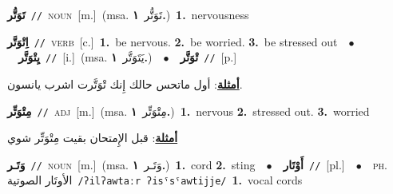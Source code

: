 \documentclass[10pt,a4paper,twoside]{article} %
\begin{document}
\begin{multicols}{2}
{{{{{\setlength\topsep{0pt}\textbf{\foreignlanguage{arabic}{تَوَتُّر}}\ {\color{gray}\texttt{//}\color{black}}\ \textsc{noun}\ [m.]\ \color{gray}(msa. \foreignlanguage{arabic}{تَوَتُّر}~\foreignlanguage{arabic}{\textbf{١.}})\color{black}\ \textbf{1.}~nervousness\ 

{\setlength\topsep{0pt}\textbf{\foreignlanguage{arabic}{اِتْوَتَّر}}\ {\color{gray}\texttt{//}\color{black}}\ \textsc{verb}\ [c.]\ \textbf{1.}~be nervous.  \textbf{2.}~be worried.  \textbf{3.}~be stressed out\ \ $\bullet$\ \ \setlength\topsep{0pt}\textbf{\foreignlanguage{arabic}{يِتْوَتَّر}}\ {\color{gray}\texttt{//}\color{black}}\ [i.]\ \color{gray}(msa. \foreignlanguage{arabic}{يَتَوَتَّر}~\foreignlanguage{arabic}{\textbf{١.}})\color{black}\ \ $\bullet$\ \ \setlength\topsep{0pt}\textbf{\foreignlanguage{arabic}{تْوَتَّر}}\ {\color{gray}\texttt{//}\color{black}}\ [p.]\  \begin{flushright}\color{gray}\foreignlanguage{arabic}{\textbf{\underline{\foreignlanguage{arabic}{أمثلة}}}: أول ماتحس حالك إِنك تْوَتَّرت اشرب يانسون.}\end{flushright}\color{black}} \vspace{2mm}

{\setlength\topsep{0pt}\textbf{\foreignlanguage{arabic}{مِتْوَتِّر}}\ {\color{gray}\texttt{//}\color{black}}\ \textsc{adj}\ [m.]\ \color{gray}(msa. \foreignlanguage{arabic}{مِتْوَتِّر}~\foreignlanguage{arabic}{\textbf{١.}})\color{black}\ \textbf{1.}~nervous  \textbf{2.}~stressed out.  \textbf{3.}~worried\  \begin{flushright}\color{gray}\foreignlanguage{arabic}{\textbf{\underline{\foreignlanguage{arabic}{أمثلة}}}: قبل الإِمتحان بقيت مِتْوَتِّر شوي}\end{flushright}\color{black}} \vspace{2mm}

{\setlength\topsep{0pt}\textbf{\foreignlanguage{arabic}{وَتَـر}}\ {\color{gray}\texttt{//}\color{black}}\ \textsc{noun}\ [m.]\ \color{gray}(msa. \foreignlanguage{arabic}{وَتَـر}~\foreignlanguage{arabic}{\textbf{١.}})\color{black}\ \textbf{1.}~cord  \textbf{2.}~sting\ \ $\bullet$\ \ \setlength\topsep{0pt}\textbf{\foreignlanguage{arabic}{أَوْتَار}}\ {\color{gray}\texttt{//}\color{black}}\ [pl.]\ \ $\bullet$\ \ \textsc{ph.} \color{gray} \foreignlanguage{arabic}{الأوتَار الصوتية}\color{black}\ {\color{gray}\texttt{/{\sffamily ʔilʔawtaːr ʔisˤsˤawtijje}/}\color{black}}\ \textbf{1.}~vocal cords\ 

}}}}}}
\end{multicols}
\end{document}
